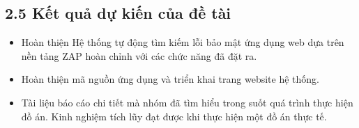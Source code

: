 \subsection*{2.5  Kết quả dự kiến của đề tài}
\begin{itemize}
    \item Hoàn thiện Hệ thống tự động tìm kiếm lỗi bảo mật ứng dụng web dựa trên nền tảng ZAP hoàn chỉnh với các chức năng đã đặt ra.
    \item Hoàn thiện mã nguồn ứng dụng và triển khai trang website hệ thống.
    \item Tài liệu báo cáo chi tiết mà nhóm đã tìm hiểu trong suốt quá trình thực hiện đồ án. Kinh nghiệm tích lũy đạt được khi thực hiện một đồ án thực tế.
\end{itemize}